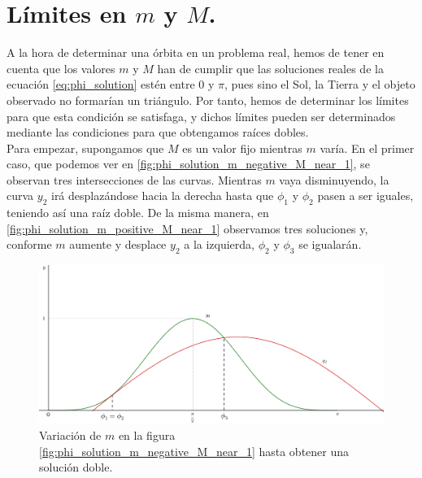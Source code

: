 \documentclass[11pt]{book}
\begin{document}
\section{Límites en $m$ y $M$.}
\label{sec:limites_m_M}
A la hora de determinar una órbita en un problema real, hemos de tener en cuenta que los valores $m$ y $M$ han de cumplir que las soluciones reales de la ecuación \eqref{eq:phi_solution} estén entre $0$ y $\pi$, pues sino el Sol, la Tierra y el objeto observado no formarían un triángulo. Por tanto, hemos de determinar los límites para que esta condición se satisfaga, y dichos límites pueden ser determinados mediante las condiciones para que obtengamos raíces dobles.\\

Para empezar, supongamos que $M$ es un valor fijo mientras $m$ varía. En el primer caso, que podemos ver en \ref{fig:phi_solution_m_negative_M_near_1}, se observan tres intersecciones de las curvas. Mientras $m$ vaya disminuyendo, la curva $y_2$ irá desplazándose hacia la derecha hasta que $\phi_1$ y $\phi_2$ pasen a ser iguales, teniendo así una raíz doble. De la misma manera, en \ref{fig:phi_solution_m_positive_M_near_1} observamos tres soluciones y, conforme $m$ aumente y desplace $y_2$ a la izquierda, $\phi_2$ y $\phi_3$ se igualarán.\\

\begin{figure}[H]
\centering
\includegraphics[scale=0.115]{images/minuscula_varia_primer_caso.png}
\caption{Variación de $m$ en la figura \ref{fig:phi_solution_m_negative_M_near_1} hasta obtener una solución doble.}
\label{fig:minuscula_varia_primer_caso}
\end{figure}
\end{document}
